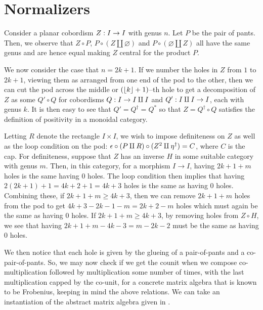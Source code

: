 
\section{Normalizers}

Consider a planar cobordism $Z : I \rightarrow I$ with genus $n$. Let $P$ be the pair
of pants. Then, we observe that $Z \circ P$, $P \circ (Z \amalg \varnothing)$
and $P \circ (\varnothing \amalg Z)$ all have the same genus and are hence equal
making $Z$ central for the product $P$.

We now consider the case that $n = 2k + 1$. If we number the holes in $Z$ from
$1$ to $2k + 1$, viewing them as arranged from one end of the pod to the other,
then we can cut the pod across the middle or $(\left\lfloor k \right\rfloor + 1)$--th hole to get a
decomposition of $Z$ as some $Q' \circ Q$ for cobordisms $Q : I \rightarrow I \amalg I$
and $Q' : I \amalg I \rightarrow I$, each with genus $k$. It is then easy to see that
$Q' = Q^{\dagger} = Q^{*}$ so that $Z = Q^{\dagger} \circ Q$ satisfies the
definition of positivity in a monoidal category.

Letting $R$ denote the rectangle $I \times I$, we wish to impose definiteness on
$Z$ as well as the loop condition on the pod:
$\epsilon \circ (P \amalg R) \circ (Z^2 \amalg \eta^{\dagger}) = C$, where $C$ is
the cap. For definiteness, suppose that $Z$ has an inverse $H$ in some suitable
category with genus $m$.  Then, in this category, for a morphism $I \to I$,
having $2k + 1 + m$ holes is the same having $0$ holes. The loop condition then
implies that having $2(2k + 1) + 1 = 4k + 2 + 1 = 4k + 3$ holes is the same as
having $0$ holes. Combining these, if $2k + 1 + m \geq 4k + 3$, then we can
remove $2k + 1 + m$ holes from the pod to get $4k + 3 - 2k - 1 - m = 2k + 2 - m$
holes which must again be the same as having $0$ holes. If
$2k + 1 + m \geq 4k + 3$, by removing holes from $Z \circ H$, we see that
having $2k + 1 + m - 4k - 3 = m - 2k - 2$ must be the same as having $0$ holes.

We then notice that each hole is given by the glueing of a pair-of-pants and a
co-pair-of-pants. So, we may now check if we get the counit when we compose
co-multiplication followed by multiplication some number of times, with the last
multiplication capped by the co-unit, for a concrete matrix algebra that is
known to be Frobenius, keeping in mind the above relations. We can take an
instantiation of the abstract matrix algebra given in
\cite[12, Prop. 2.11]{CatQChan}.

